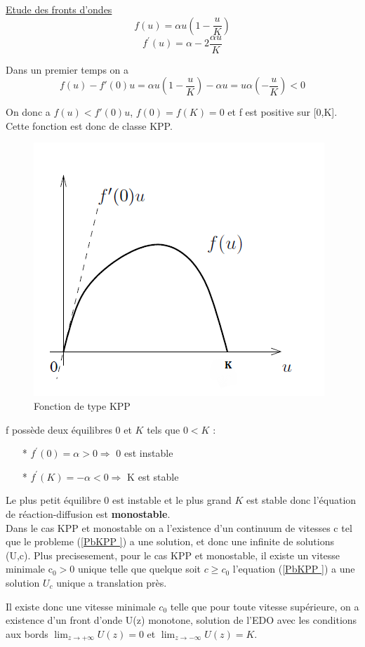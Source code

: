 \documentclass[a4paper,11pt]{article}
\begin{document}
\underline{Etude des fronts d'ondes}\\
$$f(u)= \alpha u (1 - \dfrac{u}{K})$$
$$f^\prime(u)= \alpha - 2 \frac{\alpha u}{K}$$


Dans un premier temps on a $$ f(u) - f'(0)u = \alpha u (1 - \dfrac{u}{K}) - \alpha u = u\alpha (- \dfrac{u}{K}) < 0$$

On donc a  $f(u) < f'(0)u$, $f(0) = f(K) = 0$ et f est positive sur [0,K]. Cette fonction est donc de classe KPP.

\begin{figure}[H]
	\centering
	\includegraphics[width=0.40\linewidth]{SimulationKPP/fu}\hfill
	\caption{Fonction de type KPP}
\end{figure}


f possède deux équilibres $0$ et $K$ tels que $0 < K$ :\\
	\begin{itemize}
    	\item[*] $f^\prime(0)= \alpha >0 \Rightarrow $ 0 est instable
        \item[*] $f^\prime(K)= -\alpha <0 \Rightarrow $ K est stable\\
	\end{itemize}
    
    
    Le plus petit équilibre $0$ est instable et le plus grand $K$ est stable donc l'équation de réaction-diffusion est \textbf{monostable}. \\


Dans le cas KPP et monostable on a l'existence d'un continuum de vitesses c tel que le probleme (\ref{PbKPP }) a une solution, et donc une infinite de solutions (U,c). Plus precisesement, pour le cas KPP et monostable, il existe un vitesse minimale c$_0 >0$ unique telle que quelque soit $c  \geqslant c_0$ l'equation (\ref{PbKPP }) a une solution $U_c$ unique a translation près.

    Il existe donc une vitesse minimale $c_0$ telle que pour toute vitesse supérieure, on a existence d'un front d'onde U(z) monotone, solution de l'EDO avec les conditions aux bords $\lim_{z \to +\infty} U(z)=0$ et $\lim_{z \to -\infty} U(z)=K$. \\
    
\end{document}
